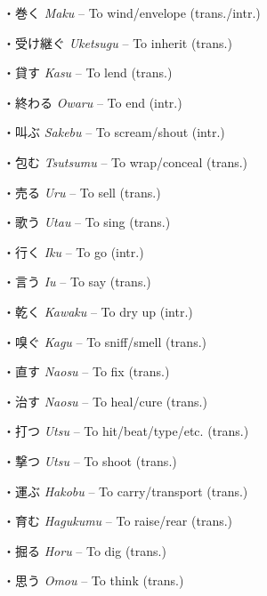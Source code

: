 \par{・巻く \emph{Maku }– To wind\slash envelope (trans.\slash intr.) }

\par{・受け継ぐ \emph{Uketsugu }– To inherit (trans.) }

\par{・貸す \emph{Kasu }– To lend (trans.) }

\par{・終わる \emph{Owaru }– To end (intr.) }

\par{・叫ぶ \emph{Sakebu }– To scream\slash shout (intr.) }

\par{・包む \emph{Tsutsumu }– To wrap\slash conceal (trans.) }

\par{・売る \emph{Uru }– To sell (trans.) }

\par{・歌う \emph{Utau }– To sing (trans.) }

\par{・行く \emph{Iku }– To go (intr.) }

\par{・言う \emph{Iu }– To say (trans.) }

\par{・乾く \emph{Kawaku }– To dry up (intr.) }

\par{・嗅ぐ \emph{Kagu }– To sniff\slash smell (trans.) }

\par{・直す \emph{Naosu }– To fix (trans.) }

\par{・治す \emph{Naosu }– To heal\slash cure (trans.) }

\par{・打つ \emph{Utsu }– To hit\slash beat\slash type\slash etc. (trans.) }

\par{・撃つ \emph{Utsu }– To shoot (trans.) }

\par{・運ぶ \emph{Hakobu }– To carry\slash transport (trans.) }

\par{・育む \emph{Hagukumu }– To raise\slash rear (trans.) }

\par{・掘る \emph{Horu }– To dig (trans.) }

\par{・思う \emph{Omou }– To think (trans.) }


